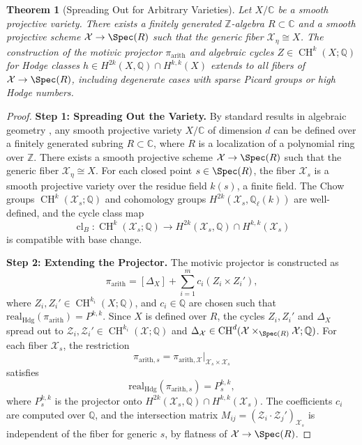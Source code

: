 \documentclass[11pt]{article}
\newtheorem{theorem}{Theorem}[section]
\DeclareMathOperator{\cl}{cl}
\DeclareMathOperator{\CH}{CH}
\begin{document}
\begin{theorem}[Spreading Out for Arbitrary Varieties]\label{thm:spreading-out}
Let \( X/\mathbb{C} \) be a smooth projective variety. There exists a finitely generated \(\mathbb{Z}\)-algebra \( R \subset \mathbb{C} \) and a smooth projective scheme \(\mathcal{X} \to \Spec(R)\) such that the generic fiber \(\mathcal{X}_\eta \cong X\). The construction of the motivic projector \(\pi_{\mathrm{arith}}\) and algebraic cycles \(Z \in \CH^k(X; \mathbb{Q})\) for Hodge classes \(h \in H^{2k}(X, \mathbb{Q}) \cap H^{k,k}(X)\) extends to all fibers of \(\mathcal{X} \to \Spec(R)\), including degenerate cases with sparse Picard groups or high Hodge numbers.
\end{theorem}
\begin{proof}
\textbf{Step 1: Spreading Out the Variety.} By standard results in algebraic geometry \cite{EGAIV}, any smooth projective variety \(X/\mathbb{C}\) of dimension \(d\) can be defined over a finitely generated subring \(R \subset \mathbb{C}\), where \(R\) is a localization of a polynomial ring over \(\mathbb{Z}\). There exists a smooth projective scheme \(\mathcal{X} \to \Spec(R)\) such that the generic fiber \(\mathcal{X}_\eta \cong X\). For each closed point \(s \in \Spec(R)\), the fiber \(\mathcal{X}_s\) is a smooth projective variety over the residue field \(k(s)\), a finite field. The Chow groups \(\CH^k(\mathcal{X}_s; \mathbb{Q})\) and cohomology groups \(H^{2k}(\mathcal{X}_s, \mathbb{Q}_\ell(k))\) are well-defined, and the cycle class map
\begin{dmath}
\cl_B: \CH^k(\mathcal{X}_s; \mathbb{Q}) \to H^{2k}(\mathcal{X}_s, \mathbb{Q}) \cap H^{k,k}(\mathcal{X}_s)
\end{dmath}
is compatible with base change.

\textbf{Step 2: Extending the Projector.} The motivic projector is constructed as
\begin{dmath}
\pi_{\mathrm{arith}} = [\Delta_X] + \sum_{i=1}^m c_i (Z_i \times Z_i'),
\end{dmath}
where \(Z_i, Z_i' \in \CH^{k_i}(X; \mathbb{Q})\), and \(c_i \in \mathbb{Q}\) are chosen such that \(\mathrm{real}_{\mathrm{Hdg}}(\pi_{\mathrm{arith}}) = P^{k,k}\). Since \(X\) is defined over \(R\), the cycles \(Z_i, Z_i'\) and \(\Delta_X\) spread out to \(\mathcal{Z}_i, \mathcal{Z}_i' \in \CH^{k_i}(\mathcal{X}; \mathbb{Q})\) and \(\Delta_{\mathcal{X}} \in \CH^d(\mathcal{X} \times_{\Spec(R)} \mathcal{X}; \mathbb{Q})\). For each fiber \(\mathcal{X}_s\), the restriction
\begin{dmath}
\pi_{\mathrm{arith}, s} = \pi_{\mathrm{arith}, \mathcal{X}}|_{\mathcal{X}_s \times \mathcal{X}_s}
\end{dmath}
satisfies
\begin{dmath}
\mathrm{real}_{\mathrm{Hdg}}(\pi_{\mathrm{arith}, s}) = P^{k,k}_s,
\end{dmath}
where \(P^{k,k}_s\) is the projector onto \(H^{2k}(\mathcal{X}_s, \mathbb{Q}) \cap H^{k,k}(\mathcal{X}_s)\). The coefficients \(c_i\) are computed over \(\mathbb{Q}\), and the intersection matrix \(M_{ij} = (\mathcal{Z}_i \cdot \mathcal{Z}_j')_{\mathcal{X}_s}\) is independent of the fiber for generic \(s\), by flatness of \(\mathcal{X} \to \Spec(R)\).


\end{proof}
\end{document}
